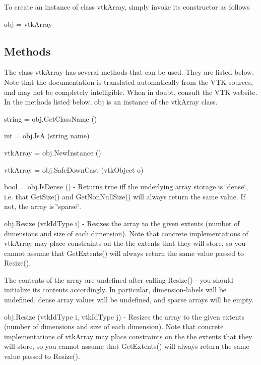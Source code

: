 To create an instance of class vtk\-Array, simply invoke its constructor as follows \begin{DoxyVerb}  obj = vtkArray
\end{DoxyVerb}
 \hypertarget{vtkwidgets_vtkxyplotwidget_Methods}{}\subsection{Methods}\label{vtkwidgets_vtkxyplotwidget_Methods}
The class vtk\-Array has several methods that can be used. They are listed below. Note that the documentation is translated automatically from the V\-T\-K sources, and may not be completely intelligible. When in doubt, consult the V\-T\-K website. In the methods listed below, {\ttfamily obj} is an instance of the vtk\-Array class. 
\begin{DoxyItemize}
\item {\ttfamily string = obj.\-Get\-Class\-Name ()}  
\item {\ttfamily int = obj.\-Is\-A (string name)}  
\item {\ttfamily vtk\-Array = obj.\-New\-Instance ()}  
\item {\ttfamily vtk\-Array = obj.\-Safe\-Down\-Cast (vtk\-Object o)}  
\item {\ttfamily bool = obj.\-Is\-Dense ()} -\/ Returns true iff the underlying array storage is \char`\"{}dense\char`\"{}, i.\-e. that Get\-Size() and Get\-Non\-Null\-Size() will always return the same value. If not, the array is \char`\"{}sparse\char`\"{}.  
\item {\ttfamily obj.\-Resize (vtk\-Id\-Type i)} -\/ Resizes the array to the given extents (number of dimensions and size of each dimension). Note that concrete implementations of vtk\-Array may place constraints on the the extents that they will store, so you cannot assume that Get\-Extents() will always return the same value passed to Resize().

The contents of the array are undefined after calling Resize() -\/ you should initialize its contents accordingly. In particular, dimension-\/labels will be undefined, dense array values will be undefined, and sparse arrays will be empty.  
\item {\ttfamily obj.\-Resize (vtk\-Id\-Type i, vtk\-Id\-Type j)} -\/ Resizes the array to the given extents (number of dimensions and size of each dimension). Note that concrete implementations of vtk\-Array may place constraints on the the extents that they will store, so you cannot assume that Get\-Extents() will always return the same value passed to Resize().


\end{DoxyItemize}
